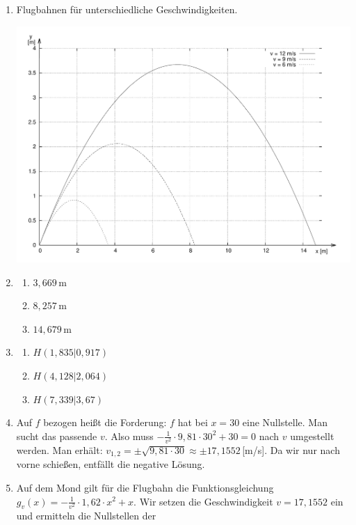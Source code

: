 \documentclass[11pt,a4paper,twoside,fleqn]{article}
\begin{document}
\begin{solution}
  \begin{enumerate}
  \item Flugbahnen für unterschiedliche Geschwindigkeiten.

    \includegraphics[width=.8\linewidth]{pics/graph_2}
  \item
    \begin{multicols}{3}
      \begin{enumerate}
      \item $3,669\,$m
      \item $8,257\,$m
      \item $14,679\,$m
      \end{enumerate}
    \end{multicols}
  \item
    \begin{multicols}{3}
      \begin{enumerate} 
      \item $H(1,835|0,917)$
      \item $H(4,128|2,064)$
      \item $H(7,339|3,67)$
      \end{enumerate}
    \end{multicols}
  \item Auf $f$ bezogen heißt die Forderung: $f$ hat bei $x=30$ eine
    Nullstelle. Man sucht das passende $v$. Also muss
    $-\frac 1 {v^2} \cdot 9,81\cdot 30^2 + 30=0$ nach $v$
    umgestellt werden. Man erhält:
    $v_{1,2}=\pm\sqrt{9,81\cdot 30}\approx \pm 17,1552\,$[m/s]. Da wir
    nur nach vorne schießen, entfällt die negative Lösung.
  \item Auf dem Mond gilt für die Flugbahn die Funktionsgleichung 
    $g_v(x)=-\frac 1 {v^2} \cdot 1,62\cdot x^2 + x$. Wir setzen die
    Geschwindigkeit $v=17,1552$ ein und ermitteln die Nullstellen der

\end{enumerate}
\end{solution}
\end{document}

